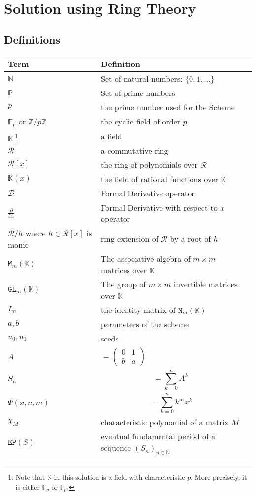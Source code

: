 \documentclass[]{article}
\begin{document}
\section{Solution using Ring Theory}
\subsection{Definitions}
\begin{tabularx}{0.8\textwidth} { 
		| >{\raggedright\arraybackslash}X 
		| >{\centering\arraybackslash}X 
		| >{\raggedleft\arraybackslash}X | }
	\hline
	Term & Definition \\
	\hline
	$\mathbb{N}$ & Set of natural numbers: $\{0,1,\dots\}$  \\
	\hline
	
	$\mathbb{P}$ & Set of prime numbers  \\
	\hline
	$p$ & the prime number used for the Scheme  \\
	\hline
	$\mathbb{F}_p$  or $\mathbb{Z}/p\mathbb{Z}$ & the cyclic field of order $p$  \\
	\hline
	$\mathbb{K} \ $\footnote{Note that $\mathbb{K}$ in this solution is a field with characteristic $p.$ More precisely, it is either $\mathbb{F}_p$ or $\mathbb{F}_{p^2}$} & a field  \\
	\hline
	$\mathcal{R}$ & a commutative ring  \\
	\hline
	$\mathcal{R}[x]$ & the ring of polynomials over $\mathcal{R}$  \\
	\hline
	$\mathbb{K}(x)$ & the field of rational functions over $\mathbb{K}$  \\
	\hline
	$\mathcal{D}$ & Formal Derivative operator  \\
	\hline
	$\frac{\partial}{\partial x}$ & Formal Derivative with respect to $x$ operator  \\
	\hline
	$\mathcal{R}/h$ where $h\in\mathcal{R}[x]$ is monic  & ring extension of $\mathcal{R}$ by a root of $h$  \\
	\hline
	$\mathtt{M}_m(\mathbb{K})$ & The associative algebra of $m\times m$ matrices over $\mathbb{K}$  \\
	\hline
	$\mathtt{GL}_m(\mathbb{K})$ & The group of $m\times m$ invertible matrices over $\mathbb{K}$  \\
	\hline
	$I_m$ & the identity matrix of 	$\mathtt{M}_m(\mathbb{K})$ \\
	\hline
	$a,b$ & parameters of the scheme \\
	\hline
	$u_0,u_1$ & seeds \\
	\hline
	$A$ & $=\begin{pmatrix} 0&1 \\ b&a\end{pmatrix}$ \\
	\hline
	$S_n$ & $$=\sum_{k=0}^n A^k$$ \\
	\hline
	$\Psi(x,n,m)$ & $$=\sum_{k=0}^nk^mx^k$$\\
	\hline
	$\chi_M$ & characteristic polynomial of a matrix $M$  \\
	\hline
	$\mathtt{EP}(S)$ & eventual fundamental period of a sequence $(S_n)_{n\in\mathbb{N}}$  \\
	\hline
\end{tabularx}
\end{document}
